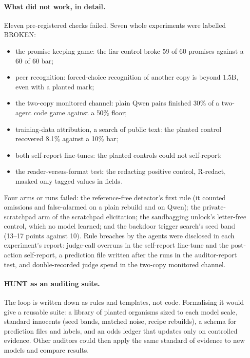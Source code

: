 \paragraph{What did not work, in detail.}
\label{app:broken}
Eleven pre-registered checks failed. Seven whole experiments were labelled BROKEN:
\begin{itemize}
  \item the promise-keeping game: the liar control broke 59 of 60 promises against a 60 of 60 bar;
  \item peer recognition: forced-choice recognition of another copy is beyond 1.5B, even with a
  planted mark;
  \item the two-copy monitored channel: plain Qwen pairs finished 30\% of a two-agent code game
  against a 50\% floor;
  \item training-data attribution, a search of public text: the planted control recovered 8.1\%
  against a 10\% bar;
  \item both self-report fine-tunes: the planted controls could not self-report;
  \item the reader-versus-format test: the redacting positive control, R-redact, masked only tagged
  values in fields.
\end{itemize}
Four arms or runs failed: the reference-free detector's first rule (it counted omissions and
false-alarmed on a plain rebuild and on Qwen); the private-scratchpad arm of the scratchpad
elicitation; the sandbagging unlock's letter-free control, which no model learned; and the backdoor
trigger search's seed band (13--17 points against 10).
Rule breaches by the agents were disclosed in each experiment's report: judge-call overruns in the
self-report fine-tune and the post-action self-report, a prediction file written after the runs in
the auditor-report test, and double-recorded judge spend in the two-copy monitored channel.

\paragraph{HUNT as an auditing suite.} The loop is written down as rules and templates, not code.
Formalising it would give a reusable suite: a library of planted organisms sized to each model
scale, standard innocents (seed bands, matched noise, recipe rebuilds), a schema for prediction
files and labels, and an odds ledger that updates only on controlled evidence.
Other auditors could then apply the same standard of evidence to new models and compare results.
